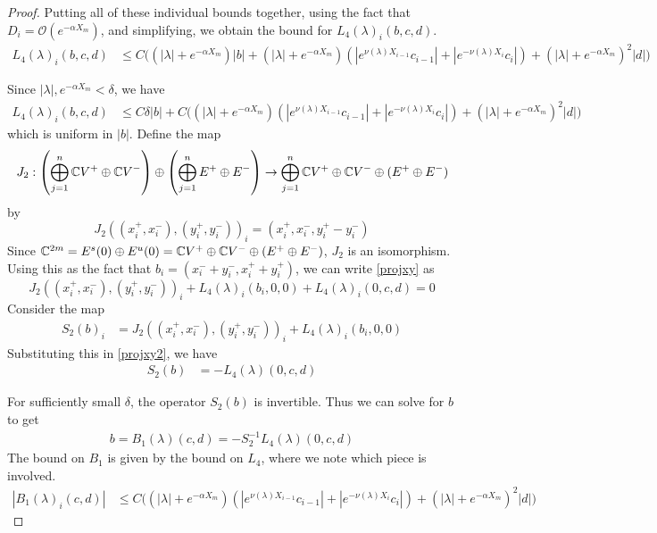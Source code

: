 \documentclass[thesis.tex]{subfiles}
\begin{document}
\begin{lemma}
\begin{proof}
Putting all of these individual bounds together, using the fact that $D_i = \mathcal{O}(e^{-\alpha X_m})$, and simplifying, we obtain the bound for $L_4(\lambda)_i(b, c, d)$.
\begin{align*}
L_4(\lambda)_i(b, c, d) &\leq 
C\Big( (|\lambda| + e^{-\alpha X_m})|b|  
+ (|\lambda| + e^{-\alpha X_m})(|e^{\nu(\lambda)X_{i-1}} c_{i-1}| + |e^{-\nu(\lambda)X_i} c_i|) + (|\lambda| + e^{-\alpha X_m})^2 |d|  \Big) 
\end{align*}

Since $|\lambda|, e^{-\alpha X_m} < \delta$, we have
\begin{align*}
L_4(\lambda)_i(b, c, d) &\leq C \delta |b| 
+ C \Big( (|\lambda| + e^{-\alpha X_m})(|e^{\nu(\lambda)X_{i-1}} c_{i-1}| + |e^{-\nu(\lambda)X_i} c_i|) + (|\lambda| + e^{-\alpha X_m})^2 |d| \Big) 
\end{align*}
which is uniform in $|b|$. Define the map
\[
J_2: \left( \bigoplus_{j=1}^n \mathbb{C} V^+ \oplus \mathbb{C} V^- \right) \oplus
\left( \bigoplus_{j=1}^n E^+ \oplus E^- \right) 
\rightarrow \bigoplus_{j=1}^n \mathbb{C} V^+ \oplus \mathbb{C} V^- \oplus (E^+ \oplus E^-)
\]
by 
\[
J_2( (x_i^+, x_i^-),(y_i^+, y_i^-))_i = ( x_i^+, x_i^-, y_i^+ - y_i^- )
\]
Since $\mathbb{C}^{2m} = E^s(0) \oplus E^u(0) = \mathbb{C} V^+ \oplus \mathbb{C} V^- \oplus (E^+ \oplus E^-)$, $J_2$ is an isomorphism. Using this as the fact that $b_i = (x_i^- + y_i^-, x_i^+ + y_i^+)$, we can write \eqref{projxy} as
\begin{equation}\label{projxy2}
J_2( (x_i^+, x_i^-),(y_i^+, y_i^-))_i 
+ L_4(\lambda)_i(b_i, 0, 0) + L_4(\lambda)_i(0, c, d) = 0
\end{equation}
Consider the map
\begin{align*}
S_2(b)_i &= J_2( (x_i^+, x_i^-),(y_i^+, y_i^-))_i 
+ L_4(\lambda)_i(b_i, 0, 0) 
\end{align*}
Substituting this in \eqref{projxy2}, we have
\begin{align*}
S_2(b) &= -L_4(\lambda)(0, c, d)
\end{align*}

For sufficiently small $\delta$, the operator $S_2(b)$ is invertible. Thus we can solve for $b$ to get
\begin{align}
b = B_1(\lambda)(c,d) 
= -S_2^{-1} L_4(\lambda)(0, c, d)
\end{align}
The bound on $B_1$ is given by the bound on $L_4$, where we note which piece is involved.
\begin{align*}
|B_1(\lambda)_i(c, d)| &\leq C \Big( (|\lambda| + e^{-\alpha X_m})(|e^{\nu(\lambda)X_{i-1}} c_{i-1}| + |e^{-\nu(\lambda)X_i} c_i|) + (|\lambda| + e^{-\alpha X_m})^2 |d| \Big)
\end{align*}


\end{proof}
\end{lemma}
\end{document}
